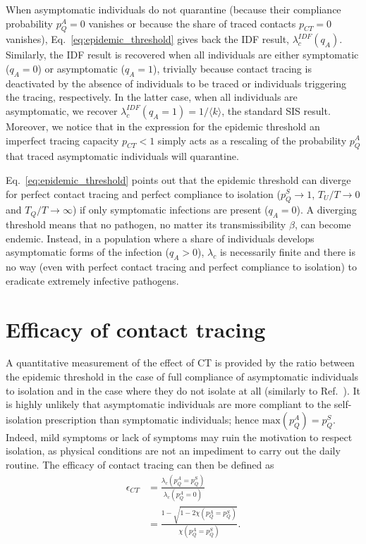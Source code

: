 \documentclass[aps,twocolumn,superscriptaddress,nofootinbib,pre,floatfix]{revtex4-1}
\begin{document}
When asymptomatic individuals do not quarantine (because their
compliance probability $p_Q^A = 0$ vanishes or because the share of
traced contacts $p_{CT} = 0$ vanishes), Eq.~\eqref{eq:epidemic_threshold}
gives back the IDF result, $\lambda_c^{IDF}(q_A)$.
Similarly, the IDF result is recovered when all individuals are
either symptomatic ($q_A = 0$) or asymptomatic ($q_A = 1$), trivially
because contact tracing is deactivated by the absence of individuals to be
traced or individuals triggering the tracing, respectively.
In the latter case, when all individuals are asymptomatic,
we recover $\lambda_c^{IDF}(q_A=1) = 1/\langle k \rangle$, the standard SIS result.
Moreover, we notice that in the expression for the
epidemic threshold an imperfect tracing capacity $p_{CT} < 1$ simply
acts as a rescaling of the probability $p_Q^A$ that traced
asymptomatic individuals will quarantine.

Eq.~\eqref{eq:epidemic_threshold} points out that
the epidemic threshold can diverge for perfect contact tracing and perfect compliance to isolation
($p_Q^S \to 1$, $T_U/T \to 0$ and $T_Q/T \to \infty$)
if only symptomatic infections are present ($q_A = 0$).
A diverging threshold means that no pathogen,
no matter its transmissibility $\beta$, can become endemic.
Instead, in a population where a share of individuals
develops asymptomatic forms of the infection ($q_A>0$),
$\lambda_c$ is necessarily finite and there is no way
(even with perfect contact tracing and perfect compliance to
isolation) to eradicate extremely infective pathogens.


\section{Efficacy of contact tracing}

A quantitative measurement of the effect of CT is provided by
the ratio between the epidemic threshold in the case of full
compliance of asymptomatic individuals to isolation and in the case
where they do not isolate at all (similarly to Ref.~\cite{Heidecke}).
It is highly unlikely that asymptomatic individuals are more compliant to the
self-isolation prescription than symptomatic individuals; hence
$\text{max}(p_Q^A) = p_Q^S$.
Indeed, mild symptoms or lack of symptoms
may ruin the motivation to respect isolation, as physical conditions
are not an impediment to carry out the daily routine.
The efficacy of contact tracing can then be defined as
\begin{align}
    \epsilon_{CT} &= \frac{\lambda_c(p_Q^A = p_Q^S)}{\lambda_c(p_Q^A = 0)} \nonumber\\
    &= \frac{1 - \sqrt{1 - 2 \chi(p_Q^A = p_Q^S)}}{\chi(p_Q^A = p_Q^S)}.
    \label{epsilon}
\end{align}
\end{document}
